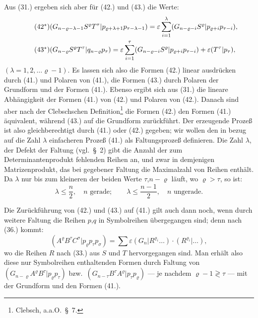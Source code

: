\documentclass[12pt,a4paper]{article}
\begin{document}
Aus (31.) ergeben sich aber für (42.) und (43.) die Werte:
\begin{align*}\tag{42$^{*}$}
&(G_{n-\varrho-\lambda-1} S^{\varrho} T^{\tau} | p_{\varrho+\lambda+1} p_{\tau-\lambda-1}) = \varepsilon \sum_{i=1}^{\lambda} (G_{n-\varrho-i} S^{\varrho} | p_{\varrho+i} p_{\tau-i}), \\ \tag{43$^{*}$}
&(G_{n-\varrho} S^{\varrho} T^{\tau} | q_{n-\varrho} p_{\tau}) = \varepsilon \sum_{i=1}^{\tau} (G_{n-\varrho-i} S^{\varrho} | p_{\varrho+i} p_{\tau-i}) + \varepsilon (T^{\tau} | p_{\tau}),
\end{align*}
$(\lambda = 1, 2, \ldots \varrho-1)$. Es lassen sich also die Formen (42.) linear ausdrücken durch (41.) und Polaren von (41.), die Formen (43.) durch Polaren der Grundform und der Formen (41.). Ebenso ergibt sich aus (31.) die lineare Abhängigkeit der Formen (41.) von (42.) und Polaren von (42.). Danach sind aber nach der Clebschschen Definition\footnote{Clebsch, a.a.O.\ \S\ 7.} die Formen (42.) den Formen (41.) äquivalent, während (43.) auf die Grundform zurückführt. Der erzeugende Prozeß ist also gleichberechtigt durch (41.) oder (42.) gegeben; wir wollen den in bezug auf die Zahl $\lambda$ einfacheren Prozeß (41.) als Faltungsprozeß definieren. Die Zahl $\lambda$, der Defekt der Faltung (vgl.\ \S\ 2) gibt die Anzahl der zum Determinantenprodukt fehlenden Reihen an, und zwar in demjenigen Matrizenprodukt, das bei gegebener Faltung die Maximalzahl von Reihen enthält. Da $\lambda$ nur bis zum kleineren der beiden Werte $\tau$,$n-\varrho$ läuft, wo $\varrho > \tau$, so ist:
\begin{equation}\tag{44}
\lambda \leq \frac{n}{2}, \quad n \text{ gerade}; \qquad \lambda \leq \frac{n-1}{2}, \quad n \text{ ungerade}.
\end{equation}

Die Zurückführung von (42.) und (43.) auf (41.) gilt auch dann noch, wenn durch weitere Faltung die Reihen $p$,$q$ in Symbolreihen übergegangen sind; denn nach (36.) kommt:
\begin{equation*}
(A^{\varrho} B^{\tau} C^{\sigma} | p_{\varrho} p_{\tau} p_{\sigma}) = \sum \varepsilon (G_{n} | R^{\varrho_{i}} \ldots) \cdot (R^{\varrho_{i}} | \ldots),
\end{equation*}
wo die Reihen $R$ nach (33.) aus $S$ und $T$ hervorgegangen sind. Man erhält also diese nur Symbolreihen enthaltenden Formen durch Faltung von $(G_{n-\varrho} A^{\varrho} B^{\tau} | p_{\varrho} p_{\tau})$ bzw.\ $(G_{n-\tau} B^{\tau} A^{\varrho} | p_{\tau} p_{\varrho})$ --- je nachdem $\varrho-1 \gtrless \tau$ --- mit der Grundform und den Formen (41.).
\end{document}
